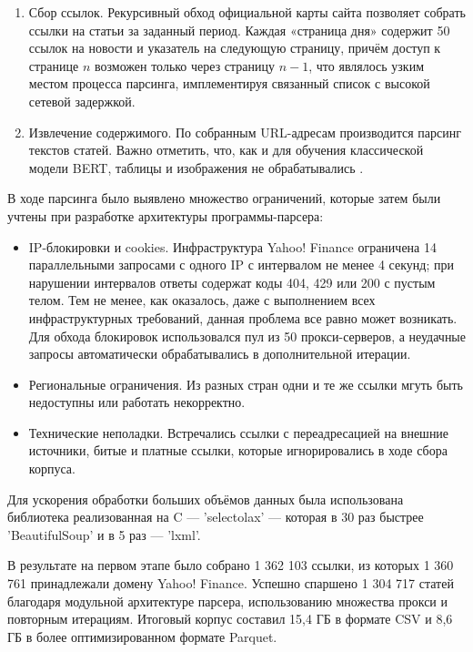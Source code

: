 \begin{enumerate}
    \item Сбор ссылок. Рекурсивный обход официальной карты сайта позволяет собрать ссылки на статьи за заданный период.
    Каждая «страница дня» содержит 50 ссылок на новости и указатель на следующую страницу, причём доступ к странице $n$
    возможен только через страницу $n-1$, что являлось узким местом процесса парсинга, имплементируя связанный список
    с высокой сетевой задержкой.
    \item Извлечение содержимого. По собранным URL-адресам производится парсинг текстов статей. Важно отметить,
    что, как и для обучения классической модели BERT, таблицы и изображения не обрабатывались \parencite{devlin2019BERT}.
\end{enumerate}

В ходе парсинга было выявлено множество ограничений, которые затем были учтены при разработке архитектуры программы-парсера:

\begin{itemize}
    \item IP-блокировки и cookies. Инфраструктура Yahoo! Finance ограничена 14 параллельными запросами с одного IP
    с интервалом не менее 4 секунд; при нарушении интервалов ответы содержат коды 404, 429 или 200 с пустым телом. Тем не менее,
    как оказалось, даже с выполнением всех инфраструктурных требований, данная проблема все равно может возникать. Для обхода
    блокировок использовался пул из 50 прокси-серверов, а неудачные запросы автоматически обрабатывались в дополнительной итерации.
    \item Региональные ограничения. Из разных стран одни и те же ссылки мгуть быть недоступны или работать некорректно.
    \item Технические неполадки. Встречались ссылки с переадресацией на внешние источники, битые и платные ссылки,
    которые игнорировались в ходе сбора корпуса.
\end{itemize}

Для ускорения обработки больших объёмов данных была использована библиотека реализованная на C --- 'selectolax' ---
которая в 30 раз быстрее 'BeautifulSoup' и в 5 раз — 'lxml'.

В результате на первом этапе было собрано 1 362 103 ссылки, из которых 1 360 761 принадлежали домену Yahoo! Finance.
Успешно спаршено 1 304 717 статей благодаря модульной архитектуре парсера, использованию множества прокси и повторным
итерациям. Итоговый корпус составил 15,4 ГБ в формате CSV и 8,6 ГБ в более оптимизированном формате Parquet.


